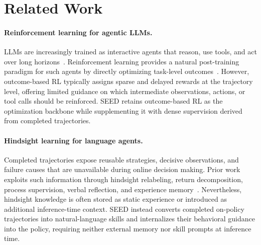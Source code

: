 \section{Related Work}\label{sec:related_work}

\paragraph{Reinforcement learning for agentic LLMs.}
LLMs are increasingly trained as interactive agents that reason, use tools, and act over long horizons~\citep{liu2023agentbench,schick2023toolformer,patil2024gorilla,luo2025large,xi2025rise,wu2026atlas,xu2026odysseyarena}. Reinforcement learning provides a natural post-training paradigm for such agents by directly optimizing task-level outcomes~\citep{shao2024deepseekmath,wang2025ragen,luo2025agentlightning,wu2026spark,lu2026skill0}. However, outcome-based RL typically assigns sparse and delayed rewards at the trajectory level, offering limited guidance on which intermediate observations, actions, or tool calls should be reinforced. SEED retains outcome-based RL as the optimization backbone while supplementing it with dense supervision derived from completed trajectories.

\vspace{-0.08in}
\paragraph{Hindsight learning for language agents.}
Completed trajectories expose reusable strategies, decisive observations, and failure causes that are unavailable during online decision making. Prior work exploits such information through hindsight relabeling, return decomposition, process supervision, verbal reflection, and experience memory~\citep{andrychowicz2017hindsight,arjona2019rudder,uesato2022solving,lightman2024lets,shinn2023reflexion,zhao2024expel,wang2023voyager,madaan2023selfrefine}. Nevertheless, hindsight knowledge is often stored as static experience or introduced as additional inference-time context. SEED instead converts completed on-policy trajectories into natural-language skills and internalizes their behavioral guidance into the policy, requiring neither external memory nor skill prompts at inference time.

\vspace{-0.08in}

